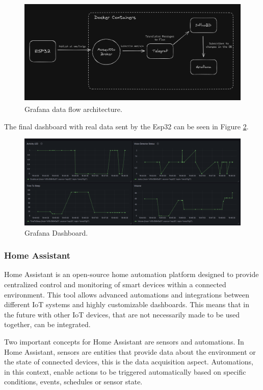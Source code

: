 \begin{figure}[H]
    \centering
    \includegraphics*[scale = 0.28]{Images/GrafanaComArch.png}
    \caption{Grafana data flow architecture\textsuperscript{\cite{Coelhomatias_2024}}.}
    \label{fig:GrafanaComArch}
\end{figure}

The final dashboard with real data sent by the Esp32 can be seen in Figure \ref{fig:GrafanaDashboard}.

\begin{figure}[H]
    \centering
    \includegraphics*[scale = 0.3]{Images/GrafanaDashboard.png}
    \caption{Grafana Dashboard.}
    \label{fig:GrafanaDashboard}
\end{figure}

\subsubsection{Home Assistant}

Home Assistant is an open-source home automation platform designed to provide centralized control and monitoring of smart devices within a connected environment. This tool allows advanced automations and integrations between different IoT systems and highly customizable dashboards. This means that in the future with other IoT devices, that are not necessarily made to be used together, can be integrated. 

Two important concepts for Home Assistant are sensors and automations. In Home Assistant, sensors are entities that provide data about the environment or the state of connected devices, this is the data acquisition aspect. Automations, in this context, enable actions to be triggered automatically based on specific conditions, events, schedules or sensor state.

